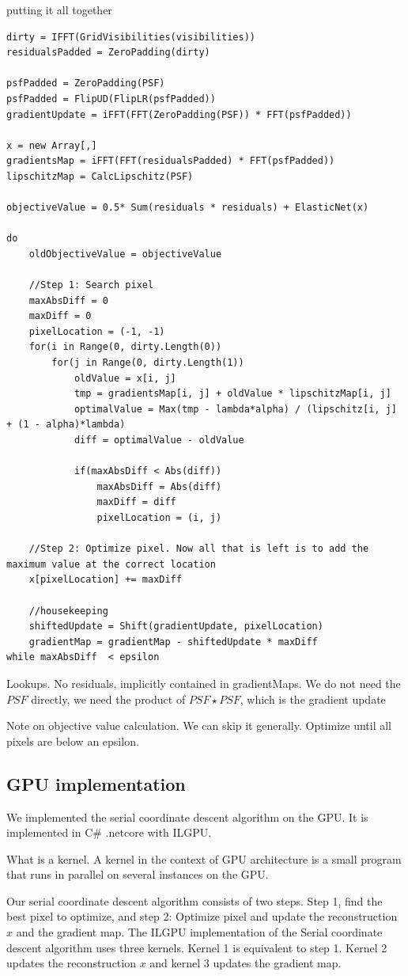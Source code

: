 putting it all together
\begin{lstlisting}
dirty = IFFT(GridVisibilities(visibilities))
residualsPadded = ZeroPadding(dirty)

psfPadded = ZeroPadding(PSF)
psfPadded = FlipUD(FlipLR(psfPadded))
gradientUpdate = iFFT(FFT(ZeroPadding(PSF)) * FFT(psfPadded))

x = new Array[,]
gradientsMap = iFFT(FFT(residualsPadded) * FFT(psfPadded))
lipschitzMap = CalcLipschitz(PSF)

objectiveValue = 0.5* Sum(residuals * residuals) + ElasticNet(x)

do 
	oldObjectiveValue = objectiveValue
	
	//Step 1: Search pixel
	maxAbsDiff = 0
	maxDiff = 0
	pixelLocation = (-1, -1)
	for(i in Range(0, dirty.Length(0))
		for(j in Range(0, dirty.Length(1))
			oldValue = x[i, j]
			tmp = gradientsMap[i, j] + oldValue * lipschitzMap[i, j]
			optimalValue = Max(tmp - lambda*alpha) / (lipschitz[i, j] + (1 - alpha)*lambda)
			diff = optimalValue - oldValue
			
			if(maxAbsDiff < Abs(diff))
				maxAbsDiff = Abs(diff)
				maxDiff = diff
				pixelLocation = (i, j)
	
	//Step 2: Optimize pixel. Now all that is left is to add the maximum value at the correct location
	x[pixelLocation] += maxDiff
	
	//housekeeping
	shiftedUpdate = Shift(gradientUpdate, pixelLocation)
	gradientMap = gradientMap - shiftedUpdate * maxDiff
while maxAbsDiff  < epsilon
\end{lstlisting}


Lookups. No residuals, implicitly contained in gradientMaps.
We do not need the $PSF$ directly, we need the product of $PSF \star PSF$, which is the gradient update

Note on objective value calculation. We can skip it generally. Optimize until all pixels are below an epsilon.


\subsection{GPU implementation}
We implemented the serial coordinate descent algorithm on the GPU. It is implemented in C\# .netcore with ILGPU\cite{ilgpu}. 

What is a kernel. A kernel in the context of GPU architecture is a small program that runs in parallel on several instances on the GPU. 

Our serial coordinate descent algorithm consists of two steps. Step 1, find the best pixel to optimize, and step 2: Optimize pixel and update the reconstruction $x$ and the gradient map. The ILGPU implementation of the Serial coordinate descent algorithm uses three kernels. Kernel 1 is equivalent to step 1. Kernel 2 updates the reconstruction $x$ and kernel 3 updates the gradient map. 

